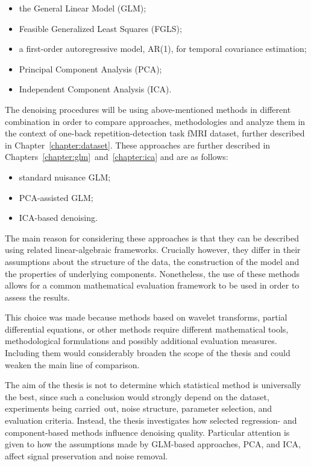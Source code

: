 \documentclass[english]{pwr_wmat_praca_dyplomowa}
\theoremstyle{definition}
\theoremstyle{remark}
\begin{document}
\begin{itemize}[itemsep=1pt]
    \item the General Linear Model (GLM);
    \item Feasible Generalized Least Squares (FGLS);
    \item a first-order autoregressive model, AR(1), for temporal covariance estimation;
    \item Principal Component Analysis (PCA);
    \item Independent Component Analysis (ICA).
\end{itemize}

The denoising procedures will be using above-mentioned methods in different combination in order to compare approaches, methodologies and analyze them in the context of one-back repetition-detection task fMRI dataset, further described in Chapter~\ref{chapter:dataset}. These approaches are further described in Chapters~\ref{chapter:glm}~and~\ref{chapter:ica} and are as follows:
\begin{itemize}[itemsep=1pt]
    \item standard nuisance GLM;
    \item PCA-assisted GLM;
    \item ICA-based denoising.
\end{itemize}

The main reason for considering these approaches is that they can be described using related linear-algebraic frameworks. Crucially however, they differ in their assumptions about the structure of the data, the construction of the model and the properties of underlying components. Nonetheless, the use of these methods allows for a common mathematical evaluation framework to be used in order to assess the results.

This choice was made because methods based on wavelet transforms, partial differential equations, or other methods require different mathematical tools, methodological formulations and possibly additional evaluation measures. Including them would considerably broaden the scope of the thesis and could weaken the main line of comparison.

The aim of the thesis is not to determine which statistical method is universally the best, since such a conclusion would strongly depend on the dataset, experiments being carried~out, noise structure, parameter selection, and evaluation criteria. Instead, the thesis investigates how selected regression- and component-based methods influence denoising quality. Particular attention is given to how the assumptions made by GLM-based approaches, PCA, and ICA, affect signal preservation and noise removal.
\end{document}
